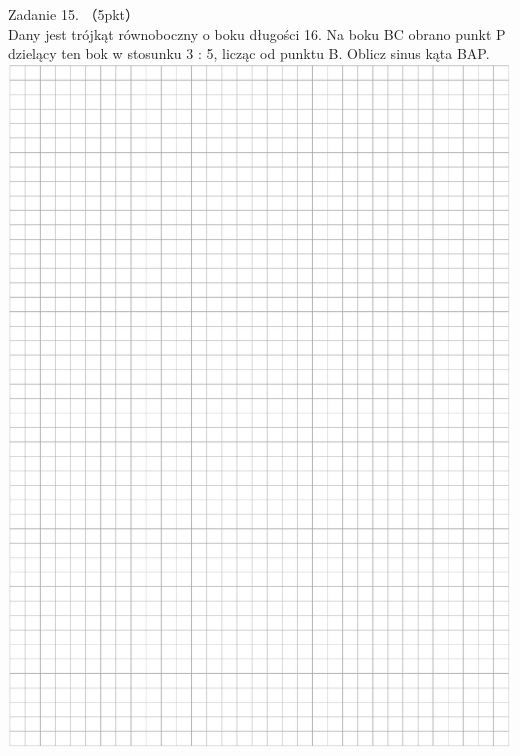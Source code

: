 \documentclass[10pt]{article}
\begin{document}
Zadanie 15. （5pkt）\\
Dany jest trójkąt równoboczny o boku długości 16. Na boku BC obrano punkt P dzielący ten bok w stosunku 3 : 5, licząc od punktu B. Oblicz sinus kąta BAP.\\
\includegraphics[max width=\textwidth, center]{2024_11_21_439e1d90cd1e7f928ae2g-13}
\end{document}
